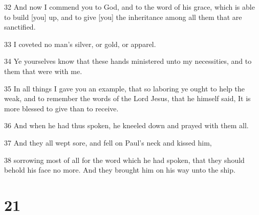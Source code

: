 \par 32 And now I commend you to God, and to the word of his grace, which is able to build [you] up, and to give [you] the inheritance among all them that are sanctified.
\par 33 I coveted no man's silver, or gold, or apparel.
\par 34 Ye yourselves know that these hands ministered unto my necessities, and to them that were with me.
\par 35 In all things I gave you an example, that so laboring ye ought to help the weak, and to remember the words of the Lord Jesus, that he himself said, It is more blessed to give than to receive.
\par 36 And when he had thus spoken, he kneeled down and prayed with them all.
\par 37 And they all wept sore, and fell on Paul's neck and kissed him,
\par 38 sorrowing most of all for the word which he had spoken, that they should behold his face no more. And they brought him on his way unto the ship.

\chapter{21}

